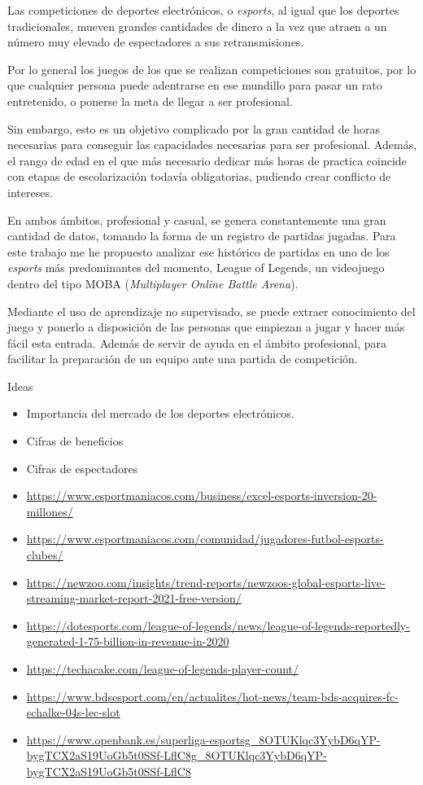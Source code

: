 
Las competiciones de deportes electrónicos, o \textit{esports}, al igual que los deportes tradicionales, mueven grandes cantidades de dinero a la vez que atraen a un número muy elevado de espectadores a sus retransmisiones.

Por lo general los juegos de los que se realizan competiciones son gratuitos, por lo que cualquier persona puede adentrarse en ese mundillo para pasar un rato entretenido, o ponerse la meta de llegar a ser profesional.

Sin embargo, esto es un objetivo complicado por la gran cantidad de horas necesarias para conseguir las capacidades necesarias para ser profesional. Además, el rango de edad en el que más necesario dedicar más horas de practica coincide con etapas de escolarización todavía obligatorias, pudiendo crear conflicto de intereses.

En ambos ámbitos, profesional y casual, se genera constantemente una gran cantidad de datos, tomando la forma de un registro de partidas jugadas. Para este trabajo me he propuesto analizar ese histórico de partidas en uno de los \textit{esports} más predominantes del momento, League of Legends, un videojuego dentro del tipo MOBA (\textit{Multiplayer Online Battle Arena}).

Mediante el uso de aprendizaje no supervisado, se puede extraer conocimiento del juego y ponerlo a disposición de las personas que empiezan a jugar y hacer más fácil esta entrada. Además de servir de ayuda en el ámbito profesional, para facilitar la preparación de un equipo ante una partida de competición.

\hfill \break
Ideas
\begin{itemize}
    \item Importancia del mercado de los deportes electrónicos.
    \item Cifras de beneficios
    \item Cifras de espectadores
    \item \url{https://www.esportmaniacos.com/business/excel-esports-inversion-20-millones/}
    \item \url{https://www.esportmaniacos.com/comunidad/jugadores-futbol-esports-clubes/}
    \item \url{https://newzoo.com/insights/trend-reports/newzoos-global-esports-live-streaming-market-report-2021-free-version/}
    \item \url{https://dotesports.com/league-of-legends/news/league-of-legends-reportedly-generated-1-75-billion-in-revenue-in-2020}
    \item \url{https://techacake.com/league-of-legends-player-count/}
    \item \url{https://www.bdsesport.com/en/actualites/hot-news/team-bds-acquires-fc-schalke-04s-lec-slot}
    \item \url{https://www.openbank.es/superliga-esportsg_8OTUKlqc3YybD6qYP-bygTCX2aS19UoGb5t0SSf-LflC8g_8OTUKlqc3YybD6qYP-bygTCX2aS19UoGb5t0SSf-LflC8}
\end{itemize}